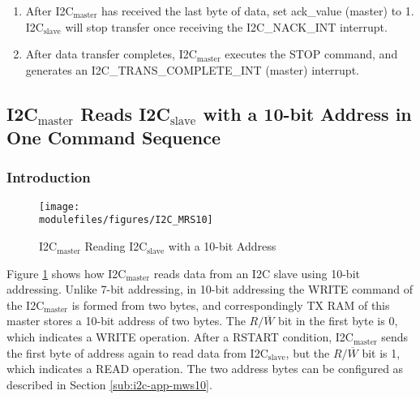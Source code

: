\documentclass[main\_\_EN.tex]{subfiles}
\begin{document}
\begin{enumerate}
\item After I2C$_\text{master}$ has received the last byte of data, set ack\_value (master) to 1. I2C$_\text{slave}$ will stop transfer once receiving the I2C\_NACK\_INT interrupt.

\item After data transfer completes, I2C$_\text{master}$ executes the STOP command, and generates an I2C\_TRANS\_COMPLETE\_INT (master) interrupt.

\end{enumerate}

\subsection{\texorpdfstring{I2C$_\text{master}$ Reads I2C$_\text{slave}$ with a 10-bit Address in One Command Sequence}{I2C master Reads I2C slave with a 10-bit Address in One Command Sequence}}
\subsubsection{Introduction}
\begin{figure}[H]
    \centering
    \texttt{[image: \\modulefiles/figures/I2C\_MRS10]}
    \caption{I2C$_\text{master}$ Reading I2C$_\text{slave}$ with a 10-bit Address}
    \label{fig:i2c-mrs10}
\end{figure}

Figure \ref{fig:i2c-mrs10} shows how I2C$_\text{master}$ reads data from an I2C slave using 10-bit addressing. Unlike 7-bit addressing, in 10-bit addressing the WRITE command of the I2C$_\text{master}$ is formed from two bytes, and correspondingly TX RAM of this master stores a 10-bit address of two bytes. The $R/\overline W$ bit in the first byte is 0, which indicates a WRITE operation. After a RSTART condition, I2C$_\text{master}$ sends the first byte of address again to read data from I2C$_\text{slave}$, but the $R/\overline W$ bit is 1, which indicates a READ operation. The two address bytes can be configured as described in Section \ref{sub:i2c-app-mws10}.
\end{document}
